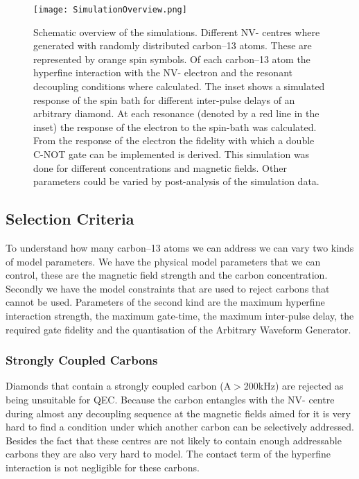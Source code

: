 \begin{figure}[htbp]
\centering
\texttt{[image: SimulationOverview.png]}
\caption{Schematic overview of the simulations. Different NV- centres where generated with randomly distributed carbon--13 atoms. These are represented by orange spin symbols. Of each carbon--13 atom the hyperfine interaction with the NV- electron and the resonant decoupling conditions where calculated. The inset shows a simulated response of the spin bath for different inter-pulse delays of an arbitrary diamond. At each resonance (denoted by a red line in the inset) the response of the electron to the spin-bath was calculated. From the response of the electron the fidelity with which a double C-NOT gate can be implemented is derived. This simulation was done for different concentrations and magnetic fields. Other parameters could be varied by post-analysis of the simulation data. }
\label{fig:simoverview}
\end{figure}



\subsection{Selection Criteria}
\label{selectioncriteria}

To understand how many carbon--13 atoms we can address we can vary two kinds of model parameters. We have the physical model parameters that we can control, these are the magnetic field strength and the carbon concentration. Secondly we have the model constraints that are used to reject carbons that cannot be used. Parameters of the second kind are the maximum hyperfine interaction strength, the maximum gate-time, the maximum inter-pulse delay, the required gate fidelity and the quantisation of the Arbitrary Waveform Generator. 

\subsubsection{Strongly Coupled Carbons}
\label{stronglycoupledcarbons}

Diamonds that contain a strongly coupled carbon (\textbar{}A\textbar{}$>$200kHz) are rejected as being unsuitable for QEC. Because the carbon entangles with the NV- centre during almost any decoupling sequence at the magnetic fields aimed for it is very hard to find a condition under which another carbon can be selectively addressed. Besides the fact that these centres are not likely to contain enough addressable carbons they are also very hard to model. The contact term of the hyperfine interaction is not negligible for these carbons. 

